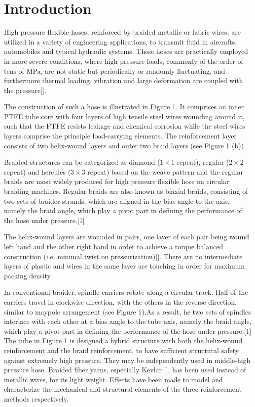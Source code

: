 \section{Introduction}
\label{introduction}

High pressure flexible hoses, reinforced by braided metallic or fabric wires, are utilized in a variety of engineering applications, to transmit fluid in aircrafts, automobiles and typical hydraulic systems. 
These hoses are practically employed in more severe conditions, where high pressure loads, commonly of the order of tens of MPa,  are not static but periodically or randomly fluctuating, and furthermore thermal loading, vibration and large deformation are coupled with the pressure[]. 



The construction of such a hose is illustrated in Figure 1. It comprises an inner PTFE tube core with four layers of high tensile steel wires wounding around it, such that the PTFE resists leakage and chemical corrosion while the steel wires layers comprise the principle load-carrying elements. The reinforcement layer consists of two helix-wound layers and outer two braid layers (see Figure 1 (b))


Braided structures can be categorized as diamond ($ 1 \times 1 $ repeat), regular ($ 2 \times 2 $ repeat) and hercules ($ 3 \times 3 $ repeat) based on the weave pattern \cite{Rawal:2015dq}  and the regular braids are most widely produced for high pressure flexible hose on circular braiding machines.
Regular braids  are also known as biaxial braids, consisting of two sets of braider strands, which are aligned in the bias angle to the axis, namely the braid angle, which play a pivot part in defining the performance of the hose under pressure.[1]



The helix-wound layers are wounded in pairs, one layer of each pair being wound left hand and the other right hand in order to achieve a torque balanced construction (i.e. minimal twist on pressurization)[]. There are no intermediate layers of plastic and wires in the same layer are touching in order for maximum packing density.



In conventional braider, spindle carriers rotate along a circular track. Half of the carriers travel in clockwise direction, with the others in the reverse direction, similar to maypole arrangement (see Figure 1).As a result, he two sets of spindles interlace with each other at a bias angle to the tube axis, namely the braid angle, which play a pivot part in defining the performance of the hose under pressure.[1]
The tube in Figure 1 is designed a hybrid structure with both the helix-wound reinforcement and the braid reinforcement, to have sufficient structural safety against extremely high pressure. They may be independently used in middle-high pressure hose. Braided fiber yarns, especially Kevlar [], has been used instead of metallic wires, for its light weight. Effects have been made to model and characterize the mechanical and structural elements of the three reinforcement methods respectively.



